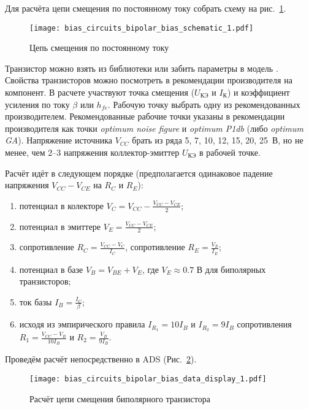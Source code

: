 Для расчёта цепи смещения по постоянному току собрать схему на рис.~\ref{fig:bias_circuits_bipolar_bias_schematic_1}.
\begin{figure}[!ht]
    \centering
    \texttt{[image: bias\_circuits\_bipolar\_bias\_schematic\_1.pdf]}
    \caption{Цепь смещения по постоянному току}%
    \label{fig:bias_circuits_bipolar_bias_schematic_1}
\end{figure}

Транзистор можно взять из библиотеки  или забить параметры в модель .
Свойства транзисторов можно посмотреть в рекомендации производителя на компонент.
В расчете участвуют точка смещения ($U_\text{КЭ}$ и $I_\text{К}$) и коэффициент усиления по току $\beta$ или $h_{fe}$.
Рабочую точку выбрать одну из рекомендованных производителем.
Рекомендованные рабочие точки указаны в рекомендации производителя как точки \emph{optimum noise figure} и \emph{optimum P1db} (либо \emph{optimum GA}).
Напряжение источника $V_{CC}$ брать из ряда 5, 7, 10, 12, 15, 20, 25~В, но не менее, чем 2--3 напряжения коллектор-эмиттер $U_\text{КЭ}$ в рабочей точке.

Расчёт идёт в следующем порядке (предполагается одинаковое падение напряжения $V_{CC} - V_{CE}$ на $R_C$ и $R_E$):
\begin{enumerate}
    \item потенциал в колекторе $V_C = V_{CC} - \frac{V_{CC} - V_{CE}}{2}$;
    \item потенциал в эмиттере $V_E = \frac{V_{CC} - V_{CE}}{2}$;
    \item сопротивление $R_C = \frac{V_{CC} - V_C}{I_C}$, сопротивление $R_E = \frac{V_E}{I_E}$;
    \item потенциал в базе $V_B = V_{BE} + V_E$, где $V_E \approx 0.7 \text{~В}$ для биполярных транзисторов;
    \item ток базы $I_B = \frac{I_C}{\beta}$;
    \item исходя из эмпирического правила $I_{R_1} = 10 I_B$ и $I_{R_2} = 9 I_B$ сопротивления $R_1 = \frac{V_{CC} - V_B}{10 I_B}$ и $R_2 = \frac{V_B}{9 I_B}$.
\end{enumerate}

Проведём расчёт непосредственно в ADS (Рис.~\ref{fig:bias_circuits_bipolar_bias_data_display_1}).
\begin{figure}[!ht]
    \centering
    \texttt{[image: bias\_circuits\_bipolar\_bias\_data\_display\_1.pdf]}
    \caption{Расчёт цепи смещения биполярного транзистора}%
    \label{fig:bias_circuits_bipolar_bias_data_display_1}
\end{figure}

